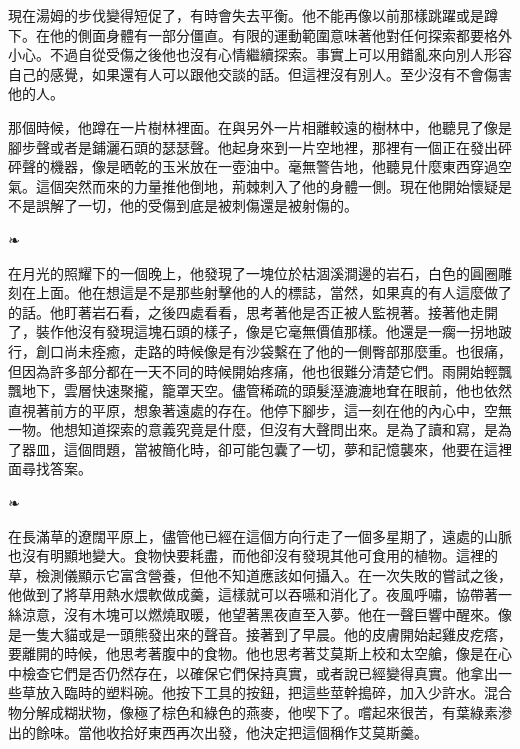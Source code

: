 \documentclass[10pt]{article}
\begin{document}
現在湯姆的步伐變得短促了，有時會失去平衡。他不能再像以前那樣跳躍或是蹲下。在他的側面身體有一部分僵直。有限的運動範圍意味著他對任何探索都要格外小心。不過自從受傷之後他也沒有心情繼續探索。事實上可以用錯亂來向別人形容自己的感覺，如果還有人可以跟他交談的話。但這裡沒有別人。至少沒有不會傷害他的人。

那個時候，他蹲在一片樹林裡面。在與另外一片相離較遠的樹林中，他聽見了像是腳步聲或者是鋪灑石頭的瑟瑟聲。他起身來到一片空地裡，那裡有一個正在發出砰砰聲的機器，像是晒乾的玉米放在一壺油中。毫無警告地，他聽見什麼東西穿過空氣。這個突然而來的力量推他倒地，荊棘刺入了他的身體一側。現在他開始懷疑是不是誤解了一切，他的受傷到底是被刺傷還是被射傷的。

\begin{center}❧\end{center}

在月光的照耀下的一個晚上，他發現了一塊位於枯涸溪澗邊的岩石，白色的圓圈雕刻在上面。他在想這是不是那些射擊他的人的標誌，當然，如果真的有人這麼做了的話。他盯著岩石看，之後四處看看，思考著他是否正被人監視著。接著他走開了，裝作他沒有發現這塊石頭的樣子，像是它毫無價值那樣。他還是一瘸一拐地跛行，創口尚未痊癒，走路的時候像是有沙袋繫在了他的一側臀部那麼重。也很痛，但因為許多部分都在一天不同的時候開始疼痛，他也很難分清楚它們。雨開始輕飄飄地下，雲層快速聚攏，籠罩天空。儘管稀疏的頭髮溼漉漉地耷在眼前，他也依然直視著前方的平原，想象著遠處的存在。他停下腳步，這一刻在他的內心中，空無一物。他想知道探索的意義究竟是什麼，但沒有大聲問出來。是為了讀和寫，是為了器皿，這個問題，當被簡化時，卻可能包囊了一切，夢和記憶襲來，他要在這裡面尋找答案。

\begin{center}❧\end{center}

在長滿草的遼闊平原上，儘管他已經在這個方向行走了一個多星期了，遠處的山脈也沒有明顯地變大。食物快要耗盡，而他卻沒有發現其他可食用的植物。這裡的草，檢測儀顯示它富含營養，但他不知道應該如何攝入。在一次失敗的嘗試之後，他做到了將草用熱水煨軟做成羹，這樣就可以吞嚥和消化了。夜風呼嘯，協帶著一絲涼意，沒有木塊可以燃燒取暖，他望著黑夜直至入夢。他在一聲巨響中醒來。像是一隻大貓或是一頭熊發出來的聲音。接著到了早晨。他的皮膚開始起雞皮疙瘩，要離開的時候，他思考著腹中的食物。他也思考著艾莫斯上校和太空艙，像是在心中檢查它們是否仍然存在，以確保它們保持真實，或者說已經變得真實。他拿出一些草放入臨時的塑料碗。他按下工具的按鈕，把這些莖幹搗碎，加入少許水。混合物分解成糊狀物，像極了棕色和綠色的燕麥，他喫下了。嚐起來很苦，有葉綠素滲出的餘味。當他收拾好東西再次出發，他決定把這個稱作艾莫斯羹。
\end{document}
